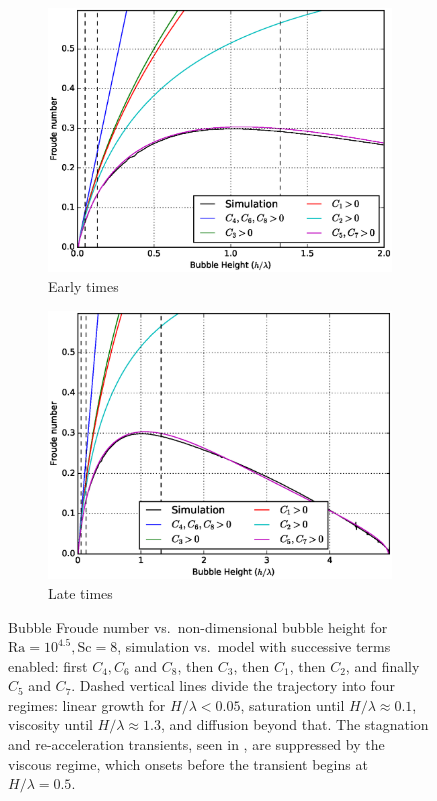 \begin{figure}
\begin{subfigure}[b]{0.5\textwidth}
\includegraphics[width=\textwidth]{figs/Cascade-short-32-4}
\caption{Early times}
\end{subfigure}
\begin{subfigure}[b]{0.5\textwidth}
\includegraphics[width=\textwidth]{figs/Cascade-32-4}
\caption{Late times}
\end{subfigure}
\caption{ 
Bubble Froude number vs.\ non-dimensional bubble height for $\text{Ra} = 10^{4.5}, \text{Sc} = 8$, simulation vs.\ model with successive terms enabled: first $C_4, C_6$ and $C_8$, then $C_3$, then $C_1$, then $C_2$, and finally $C_5$ and $C_7$.
Dashed vertical lines divide the trajectory into four regimes: linear growth for $H/\lambda < 0.05$, saturation until $H / \lambda \approx 0.1$, viscosity until $H / \lambda \approx 1.3$, and diffusion beyond that.
The stagnation and re-acceleration transients, seen in , are suppressed by the viscous regime, which onsets before the transient begins at $H / \lambda = 0.5$.
}
\end{figure}

